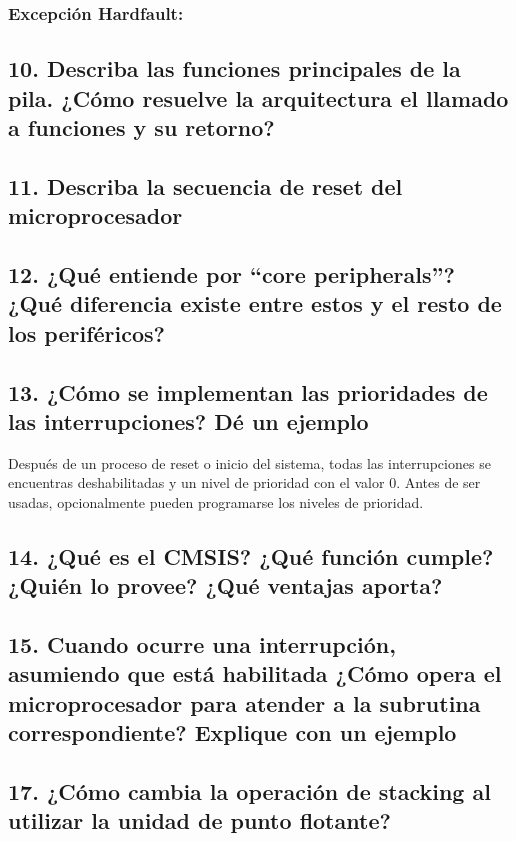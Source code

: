 \documentclass[10pt,a4paper,twoside,spanish]{article}	%
\begin{document}
\subsubsection*{Excepción Hardfault:}


\subsection*{10. Describa las funciones principales de la pila. ¿Cómo resuelve la arquitectura el llamado a funciones y su retorno?}

\subsection*{11. Describa la secuencia de reset del microprocesador}
\subsection*{12. ¿Qué entiende por “core peripherals”? ¿Qué diferencia existe entre estos y el resto de los periféricos?}

\subsection*{13. ¿Cómo se implementan las prioridades de las interrupciones? Dé un ejemplo}

Después de un proceso de reset o inicio del sistema, todas las interrupciones se encuentras deshabilitadas y un nivel de prioridad con el valor 0. Antes de ser usadas, opcionalmente pueden programarse los niveles de prioridad.


\subsection*{14. ¿Qué es el CMSIS? ¿Qué función cumple? ¿Quién lo provee? ¿Qué ventajas aporta?}

\subsection*{15. Cuando ocurre una interrupción, asumiendo que está habilitada ¿Cómo opera el microprocesador para atender a la subrutina correspondiente? Explique con un ejemplo}

\subsection*{17. ¿Cómo cambia la operación de stacking al utilizar la unidad de punto flotante?}
\end{document}
